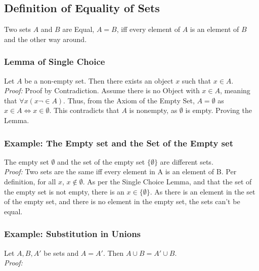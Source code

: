 \documentclass[]{scrbook}
\begin{document}
\subsection{Definition of Equality of Sets}

Two sets $A$ and $B$ are Equal, $A=B$, iff every element of $A$ is an element of $B$ and the other way around.

\subsubsection{Lemma of Single Choice}
Let $A$ be a non-empty set. Then there exists an object $x$ such that $x\in A$.\\
\textit{Proof:} Proof by Contradiction. Assume there is no Object with $x\in A$, meaning that $\forall x(x\neg\in A)$. Thus, from the Axiom of the Empty Set, $A = \emptyset$ as $x\in A \Leftrightarrow x\in\emptyset$. This contradicts that $A$ is nonempty, as $\emptyset$ is empty. Proving the Lemma.

\subsubsection{Example: The Empty set and the Set of the Empty set}
The empty set $\emptyset$ and the set of the empty set $\{\emptyset\}$ are different sets.\\
\textit{Proof:} Two sets are the same iff every element in A is an element of B. Per definition, for all $x$, $x\notin \emptyset$. As per the Single Choice Lemma, and that the set of the empty set is not empty, there is an $x \in \{\emptyset\}$. As there is an element in the set of the empty set, and there is no element in the empty set, the sets can't be equal.

\subsubsection{Example: Substitution in Unions}
Let $A, B, A'$ be sets and $A = A'$. Then $A\cup B = A'\cup B$.\\
\textit{Proof:} 
\end{document}
